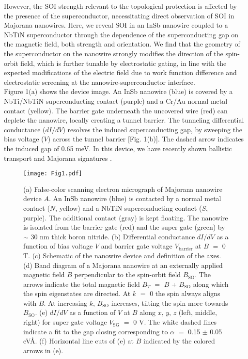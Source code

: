 However, the SOI strength relevant to the topological protection is affected by the \mbox{presence} of the superconductor, necessitating direct observation of SOI in Majorana nanowires. Here, we reveal SOI in an InSb nanowire coupled to a NbTiN superconductor through the dependence of the superconducting gap on the magnetic field, both strength and orientation. We find that the geometry of the superconductor on the nanowire strongly modifies the direction of the spin-orbit field, which is further tunable by electrostatic gating, in line with the expected modifications of the electric field due to work function difference and electrostatic screening at the nanowire-superconductor interface.
\\ \indent
Figure 1(a) shows the device image. An InSb nanowire (blue) is covered by a NbTi/NbTiN superconducting contact (purple) and a Cr/Au normal metal contact (yellow). The barrier gate underneath the uncovered wire (red) can deplete the nanowire, locally creating a tunnel barrier. The tunneling differential conductance ($dI/dV$) resolves the induced superconducting gap, by sweeping the bias voltage ($V$) across the tunnel barrier [Fig. 1(b)]. The dashed arrow indicates the induced gap of 0.65 meV. In this device, we have recently shown ballistic transport and Majorana signatures \cite{BalMaj}.
\begin{figure}
\texttt{[image: Fig1.pdf]}
\caption{\label{fig1}
    (a) False-color scanning electron micrograph of Majorana nanowire device $A$. An InSb nanowire (blue) is contacted by a normal metal contact ($N$, yellow) and a NbTiN superconducting contact ($S$, purple). The additional contact (gray) is kept floating. The nanowire is isolated from the barrier gate (red) and the super gate (green) by $\sim$ 30 nm thick boron nitride. (b) Differential conductance $dI/dV$ as a function of bias voltage $V$ and barrier gate voltage $V_{\mathrm{barrier}}$ at $B$ $=$ 0 T. (c) Schematic of the nanowire device and definition of the axes. (d) Band diagram of a Majorana nanowire at an externally applied magnetic field $B$ perpendicular to the spin-orbit field $B_{\mathrm{SO}}$. The arrows indicate the total magnetic field $B_T$ $=$ $B$ + $B_{\mathrm{SO}}$ along which the spin eigenstates are directed. At $k$ $=$ 0 the spin always aligns with $B$. At increasing $k$, $B_{\mathrm{SO}}$ increases, tilting the spin more towards $B_{\mathrm{SO}}$. (e) $dI/dV$ as a function of $V$ at $B$ along $x$, $y$, $z$ (left, middle, right) for super gate voltage $V_{\mathrm{SG}}$ $=$ 0 V. The white dashed lines indicate a fit to the gap closing corresponding to $\alpha$ $=$ 0.15 $\pm$ 0.05 eV\AA. (f) Horizontal line cuts of (e) at $B$ indicated by the colored arrows in (e).
}
\end{figure}
